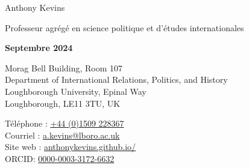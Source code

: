 \documentclass[letterpaper,fontsize=10.5pt]{scrartcl}
\begin{document}


\huge Anthony Kevins\\
\begin{minipage}[t]{.87\linewidth}
	\large Professeur agrégé en science politique et d'études internationales\\
\end{minipage}%
\begin{minipage}[t]{.13\linewidth}
	\raggedleft
	\scriptsize \textbf{Septembre 2024}\\
\end{minipage}%
\normalsize

\hrulefill

\begin{minipage}[p]{.6\linewidth}
	\raggedright
	\medskip
	Morag Bell Building, Room 107\\
	Department of International Relations, Politics, and History\\
	Loughborough University, Epinal Way\\
	Loughborough, LE11 3TU, UK\\
	\medskip
\end{minipage}%
\begin{minipage}[p]{.4\linewidth}
	\raggedleft
	\medskip
	Téléphone : \href{tel:+4401509228367}{+44 (0)1509 228367}\\
	Courriel : \href{mailto:a.kevins@lboro.ac.uk}{a.kevins@lboro.ac.uk}\\
	Site web : \href{https://anthonykevins.github.io/fr/}{anthonykevins.github.io/}\\
	ORCID: \href{https://orcid.org/0000-0003-3172-6632}{0000-0003-3172-6632}\\
	\medskip
\end{minipage}%

\hrulefill

\end{document}
